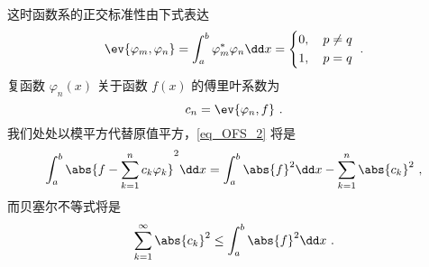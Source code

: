 这时函数系的正交标准性由下式表达
\begin{equation}
\ev{\varphi_m,\varphi_n}=\int_a^b\varphi_m^*\varphi_n\dd x=\left\{
\begin{aligned}
&0, \quad p\neq q\\
&1, \quad p=q
\end{aligned}\right.~.
\end{equation}
复函数 $\varphi_n(x)$ 关于函数 $f(x)$ 的傅里叶系数为
\begin{equation}
c_n=\ev{\varphi_n,f}~.
\end{equation}
我们处处以模平方代替原值平方，\autoref{eq_OFS_2} 将是
\begin{equation}
\int_a^b\abs{f-\sum_{k=1}^nc_k\varphi_k}^2\dd x=\int_a^b\abs{f}^2\dd x-\sum_{k=1}^n\abs{c_k}^2~,
\end{equation}
 而贝塞尔不等式将是
 \begin{equation}
 \sum_{k=1}^\infty\abs{c_k}^2\leq\int_a^b\abs{f}^2\dd x~.
 \end{equation}
 